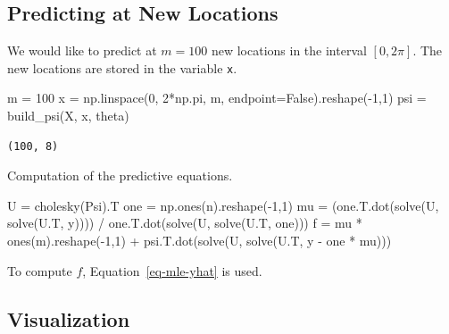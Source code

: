 \documentclass[
  letterpaper,
  DIV=11,
  numbers=noendperiod]{scrreprt}
\newenvironment{Shaded}{\begin{snugshade}}{\end{snugshade}}
\newcommand{\DecValTok}[1]{\textcolor[rgb]{0.68,0.00,0.00}{#1}}
\newcommand{\NormalTok}[1]{\textcolor[rgb]{0.00,0.23,0.31}{#1}}
\newcommand{\OperatorTok}[1]{\textcolor[rgb]{0.37,0.37,0.37}{#1}}
\newcommand{\VariableTok}[1]{\textcolor[rgb]{0.07,0.07,0.07}{#1}}
\begin{document}
\subsection{Predicting at New
Locations}\label{predicting-at-new-locations}

We would like to predict at \(m = 100\) new locations in the interval
\([0, 2\pi]\). The new locations are stored in the variable \texttt{x}.

\begin{Shaded}
\begin{Highlighting}[]
\NormalTok{m }\OperatorTok{=} \DecValTok{100}
\NormalTok{x }\OperatorTok{=}\NormalTok{ np.linspace(}\DecValTok{0}\NormalTok{, }\DecValTok{2}\OperatorTok{*}\NormalTok{np.pi, m, endpoint}\OperatorTok{=}\VariableTok{False}\NormalTok{).reshape(}\OperatorTok{{-}}\DecValTok{1}\NormalTok{,}\DecValTok{1}\NormalTok{)}
\NormalTok{psi }\OperatorTok{=}\NormalTok{ build\_psi(X, x, theta)}
\end{Highlighting}
\end{Shaded}

\begin{verbatim}
(100, 8)
\end{verbatim}

Computation of the predictive equations.

\begin{Shaded}
\begin{Highlighting}[]
\NormalTok{U }\OperatorTok{=}\NormalTok{ cholesky(Psi).T}
\NormalTok{one }\OperatorTok{=}\NormalTok{ np.ones(n).reshape(}\OperatorTok{{-}}\DecValTok{1}\NormalTok{,}\DecValTok{1}\NormalTok{)}
\NormalTok{mu }\OperatorTok{=}\NormalTok{ (one.T.dot(solve(U, solve(U.T, y)))) }\OperatorTok{/}\NormalTok{ one.T.dot(solve(U, solve(U.T, one)))}
\NormalTok{f }\OperatorTok{=}\NormalTok{ mu }\OperatorTok{*}\NormalTok{ ones(m).reshape(}\OperatorTok{{-}}\DecValTok{1}\NormalTok{,}\DecValTok{1}\NormalTok{) }\OperatorTok{+}\NormalTok{ psi.T.dot(solve(U, solve(U.T, y }\OperatorTok{{-}}\NormalTok{ one }\OperatorTok{*}\NormalTok{ mu)))}
\end{Highlighting}
\end{Shaded}

To compute \(f\), Equation~\ref{eq-mle-yhat} is used.

\subsection{Visualization}\label{visualization}
\end{document}
